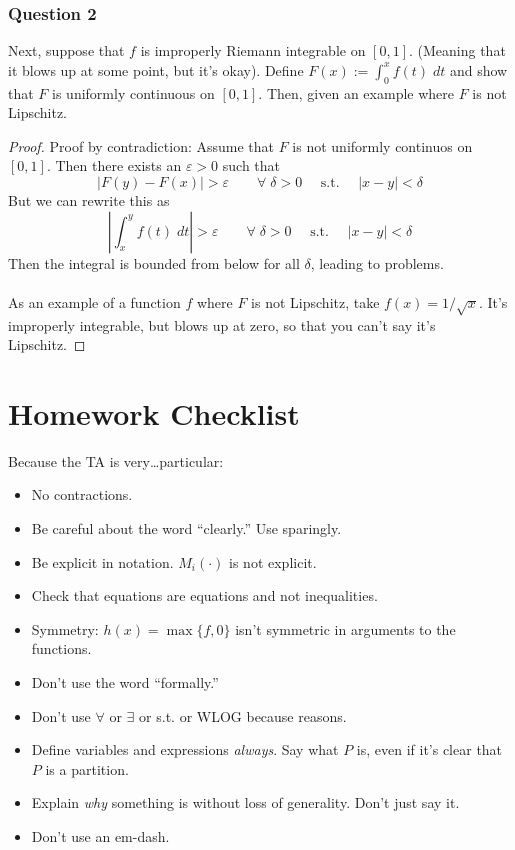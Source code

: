 \documentclass[12pt]{article}
\theoremstyle{plain}
\theoremstyle{definition}
\theoremstyle{remark}
\begin{document}
\subsubsection{Question 2}

Next, suppose that $f$ is improperly Riemann integrable on $[0,1]$. (Meaning that it blows up at some point, but it's okay). Define $F(x):=\int^x_0 f(t)\;dt$ and show that $F$ is uniformly continuous on $[0,1]$. Then, given an example where $F$ is not Lipschitz.

\begin{proof}
Proof by contradiction: Assume that $F$ is not uniformly continuos on $[0,1]$. Then there exists an $\varepsilon>0$ such that
\[
    |F(y) - F(x)| > \varepsilon \qquad
    \forall \; \delta >0 \quad \text{ s.t. } \quad 
    |x-y|< \delta
\]
But we can rewrite this as 
\[
    \left\lvert\int^y_x f(t)\;dt\right\rvert > \varepsilon \qquad
    \forall \; \delta >0 \quad \text{ s.t. } \quad 
    |x-y|< \delta
\]
Then the integral is bounded from below for all $\delta$, leading to problems.
\\
\\
As an example of a function $f$ where $F$ is not Lipschitz, take $f(x) = 1/\sqrt{x}$. It's improperly integrable, but blows up at zero, so that you can't say it's Lipschitz.
    
\end{proof}

\newpage
\section{Homework Checklist}

Because the TA is very\dots particular:
\begin{itemize}
    \item No contractions.
    \item Be careful about the word ``clearly.'' Use sparingly.
    \item Be explicit in notation. $M_i(\cdot)$ is not explicit.
    \item Check that equations are equations and not inequalities.
    \item Symmetry: $h(x) = \max\{f, 0\}$ isn't symmetric in arguments to the functions.
    \item Don't use the word ``formally.'' 
    \item Don't use $\forall$ or $\exists$ or s.t. or WLOG because reasons.
    \item Define variables and expressions \emph{always}. Say what $P$ is, even if it's clear that $P$ is a partition.
    \item Explain \emph{why} something is without loss of generality. Don't just say it.
    \item Don't use an em-dash.
\end{itemize}




% 
\end{document}
